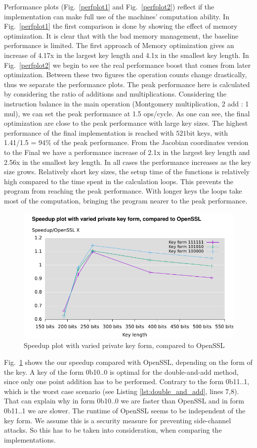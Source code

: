 Performance plots (Fig.~\ref{perfplot1} and Fig.~\ref{perfplot2}) reflect if the implementation can make full use of the machines' computation ability. In Fig.~\ref{perfplot1} the first comparison is done by showing the effect of memory optimization. It is clear that with the bad memory management, the baseline performance is limited. The first approach of Memory optimization gives an increase of 4.17x in the largest key length and 4.1x in the smallest key length. In Fig.~\ref{perfplot2} we begin to see the real performance boost that comes from later optimization. Between these two figures the operation counts change drastically, thus we separate the performance plots. The peak performance here is calculated by considering the ratio of additions and multiplications. Considering the instruction balance in the main operation (Montgomery multiplication, 2 add : 1 mul), we can set the peak performance at 1.5 ops/cycle. As one can see, the final optimization are close to the peak performance with large key sizes. The highest performance of the final implementation is reached with $521$bit keys, with 1.41/1.5 = 94\% of the peak performance. From the Jacobian coordinates version to the Final we have a performance increase of 2.1x in the largest key length and 2.56x in the smallest key length. In all cases the performance increases as the key size grows. Relatively short key sizes, the setup time of the functions is relatively high compared to the time spent in the calculation loops. This prevents the program from reaching the peak performance. With longer keys the loops take most of the computation, bringing the program nearer to the peak performance.
\begin{figure}[h!]\centering
  \includegraphics[scale=0.7]{keysize}
  \caption{Speedup plot with varied private key form, compared to OpenSSL\label{keysize}}
\end{figure}

Fig.~\ref{keysize} shows the our speedup compared with OpenSSL, depending on the form of the key. A key of the form 0b10..0 is optimal for the double-and-add method, since only one point addition has to be performed. Contrary to the form 0b11..1, which is the worst case scenario (see Listing \ref{lst:double_and_add}, lines 7,8). That can explain why in form 0b10..0 we are faster than OpenSSL and in form 0b11..1 we are slower. The runtime of OpenSSL seems to be independent of the key form. We assume this is a security measure for preventing side-channel attacks. So this has to be taken into consideration, when comparing the implementations.